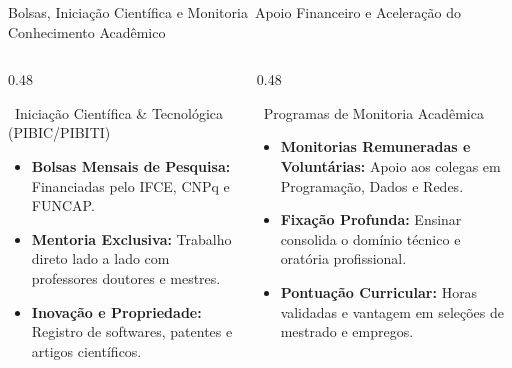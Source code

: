 \begin{frame}{Bolsas, Iniciação Científica e Monitoria}{\faMedal\ Apoio Financeiro e Aceleração do Conhecimento Acadêmico}
  \begin{columns}[t]
    \begin{column}{0.48\textwidth}
      \begin{greencard}{\faFlask\ Iniciação Científica \& Tecnológica (PIBIC/PIBITI)}
        \scriptsize
        \begin{itemize}\setlength{\itemsep}{0.25em}
          \item \textbf{Bolsas Mensais de Pesquisa:} Financiadas pelo IFCE, CNPq e FUNCAP.
          \item \textbf{Mentoria Exclusiva:} Trabalho direto lado a lado com professores doutores e mestres.
          \item \textbf{Inovação e Propriedade:} Registro de softwares, patentes e artigos científicos.
        \end{itemize}
      \end{greencard}
    \end{column}
    
    \begin{column}{0.48\textwidth}
      \begin{purplecard}{\faChalkboardTeacher\ Programas de Monitoria Acadêmica}
        \scriptsize
        \begin{itemize}\setlength{\itemsep}{0.25em}
          \item \textbf{Monitorias Remuneradas e Voluntárias:} Apoio aos colegas em Programação, Dados e Redes.
          \item \textbf{Fixação Profunda:} Ensinar consolida o domínio técnico e oratória profissional.
          \item \textbf{Pontuação Curricular:} Horas validadas e vantagem em seleções de mestrado e empregos.
        \end{itemize}
      \end{purplecard}
    \end{column}
  \end{columns}
\end{frame}
